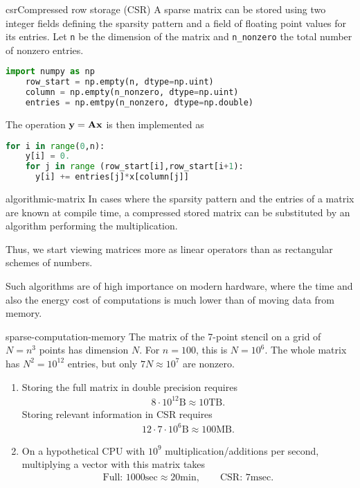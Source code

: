 \begin{Example*}{csr}{Compressed row storage (CSR)}
  A sparse matrix can be stored using two integer fields defining the
  sparsity pattern and a field of floating point values for its
  entries. Let \lstinline!n! be the dimension of the matrix and
  \lstinline!n_nonzero! the total number of nonzero entries.
  \begin{lstlisting}[language=Python]
    import numpy as np
    row_start = np.empty(n, dtype=np.uint)
    column = np.empty(n_nonzero, dtype=np.uint)
    entries = np.emtpy(n_nonzero, dtype=np.double)
  \end{lstlisting}

  The operation $\mathbf y=\mathbf A\mathbf x$ is then implemented as
  \begin{lstlisting}[language=Python]
    for i in range(0,n):
    y[i] = 0.
    for j in range (row_start[i],row_start[i+1):
      y[i] += entries[j]*x[column[j]]
  \end{lstlisting}  
\end{Example*}

\begin{Remark}{algorithmic-matrix}
  In cases where the sparsity pattern and the entries of a matrix are
  known at compile time, a compressed stored matrix can be substituted
  by an algorithm performing the multiplication.

  Thus, we start viewing matrices more as linear operators than as
  rectangular schemes of numbers.

  Such algorithms are of high importance on modern hardware, where the
  time and also the energy cost of computations is much lower than of
  moving data from memory.
\end{Remark}

\begin{Example}{sparse-computation-memory}
  The matrix of the 7-point stencil on a grid of $N=n^3$ points has
  dimension $N$. For $n=100$, this is $N=10^6$. The whole matrix has
  $N^2=10^{12}$ entries, but only $7N \approx 10^7$ are nonzero.
  \begin{enumerate}
  \item Storing the full matrix in double precision requires
    \begin{gather}
     8\cdot 10^{12}\text{B} \approx 10\text{TB}. 
    \end{gather}
    Storing relevant information in
    CSR requires
    \begin{gather}
      12\cdot7\cdot 10^6\text{B} \approx 100\text{MB}.
    \end{gather}
  \item On a hypothetical CPU with $10^9$ multiplication/additions per second, multiplying a vector with this matrix takes
    \begin{gather}
      \text{Full: } 1000\text{sec} \approx 20\text{min},
      \qquad
      \text{CSR: } 7\text{msec}.
    \end{gather}
  \end{enumerate}
\end{Example}


